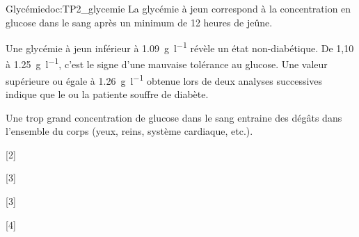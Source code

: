 \begin{doc}{Glycémie}{doc:TP2_glycemie}
  La glycémie à jeun correspond à la concentration en glucose dans le sang après un minimum de 12 heures de jeûne.

  Une glycémie à jeun inférieur à \qty{1,09}{\g\per\litre} révèle un état non-diabétique.
  De 1,10 à \qty{1,25}{\g\per\litre}, c'est le signe d'une mauvaise tolérance au glucose.
  Une valeur supérieure ou égale à \qty{1,26}{\g\per\litre} obtenue lors de deux analyses successives indique que le ou la patiente souffre de diabète.

  Une trop grand concentration de glucose dans le sang entraine des dégâts dans l'ensemble du corps (yeux, reins, système cardiaque, etc.).
\end{doc}

[2]

[3]

[3]

[4]

